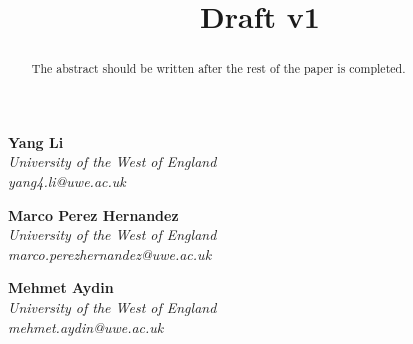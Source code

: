 \documentclass[a4paper]{article}
\title{
    \textbf{Draft v1}
}
\date{}
\begin{document}
\maketitle
\vspace{-1.5cm}

\begin{multicols}{3}
    \centering
    \textbf{Yang Li}\\
    \textit{University of the West of England}\\
    \textit{yang4.li@uwe.ac.uk}\\
    \vfill

    \textbf{Marco Perez Hernandez}\\
    \textit{University of the West of England}\\
    \textit{marco.perezhernandez@uwe.ac.uk}\\
    \vfill

    \textbf{Mehmet Aydin}\\
    \textit{University of the West of England}\\
    \textit{mehmet.aydin@uwe.ac.uk}\\
    \vfill
\end{multicols}

\singlespacing
\setlength{\parskip}{6pt}
\setlength{\parindent}{0.5cm}

\begin{abstract}
The abstract should be written after the rest of the paper is completed.
\end{abstract}
\end{document}
